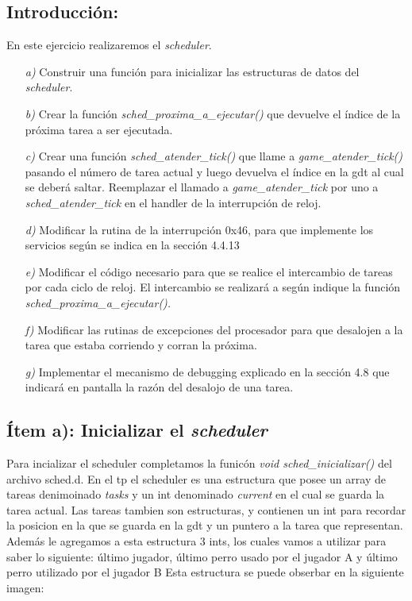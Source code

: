 \subsection{Introducción:}

En este ejercicio realizaremos el \textit{scheduler}.

\begin{itemize}

\item [\textit{a)}]  Construir una función para inicializar las estructuras de datos del \textit{scheduler}.

\item [\textit{b)}] Crear la función  \textit{sched\_proxima\_a\_ejecutar()} que devuelve el  índice de la próxima tarea a ser ejecutada. 

\item [\textit{c)}]  Crear una función \textit{sched\_atender\_tick()} que llame a \textit{game\_atender\_tick()} pasando el número de tarea actual y luego devuelva el índice en la gdt al cual se deberá saltar. Reemplazar el llamado a \textit{game\_atender\_tick} por uno a \textit{sched\_atender\_tick} en el handler de la interrupción de reloj.

\item [\textit{d)}] Modificar la rutina de la interrupción 0x46, para que implemente los servicios según se indica en la sección 4.4.13

\item [\textit{e)}]  Modificar el código necesario para que se realice el intercambio de tareas por cada ciclo de reloj. El intercambio se realizará a según indique la función \textit{sched\_proxima\_a\_ejecutar().}

\item [\textit{f)}]  Modificar las rutinas de excepciones del procesador para que desalojen a la tarea que estaba corriendo y corran la próxima.

\item [\textit{g)}] Implementar el mecanismo de debugging explicado en la sección 4.8 que indicará en pantalla la razón del desalojo de una tarea.

\end{itemize}

\subsection{Ítem a): Inicializar el \textit{scheduler}}

Para incializar el scheduler completamos la funicón \textit{void sched\_inicializar()} del archivo sched.d. En el tp el scheduler es una estructura que posee un array de tareas denimoinado \textit{tasks} y un int denominado \textit{current} en el cual se guarda la tarea actual. Las tareas tambien son estructuras, y contienen un int para recordar la posicion en la que se guarda en la gdt y un puntero a la tarea que representan. Además le agregamos a esta estructura 3 ints, los cuales vamos a utilizar para saber lo siguiente: último jugador, último perro usado por el jugador A y último perro utilizado por el jugador B Esta estructura se puede obserbar en la siguiente imagen:

